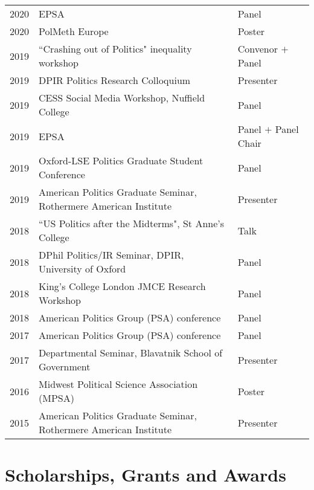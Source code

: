 \documentclass[11pt, a4paper]{article}
\begin{document}
 \begin{tabular}{lll}
 	 2020 & EPSA & Panel \\
     2020 & PolMeth Europe & Poster \\
     2019 & ``Crashing out of Politics" inequality workshop & Convenor $+$ Panel \\
     2019 & DPIR Politics Research Colloquium & Presenter \\
     2019 & CESS Social Media Workshop, Nuffield College & Panel \\
     2019 & EPSA  & Panel $+$ Panel Chair \\
     2019 & Oxford-LSE Politics Graduate Student Conference & Panel \\
     2019 & American Politics Graduate Seminar, Rothermere American Institute & Presenter \\
     2018 & ``US Politics after the Midterms", St Anne's College & Talk \\
     2018 & DPhil Politics/IR Seminar, DPIR, University of Oxford & Panel \\
     2018 & King's College London JMCE Research Workshop & Panel \\
     2018 & American Politics Group (PSA) conference & Panel \\
     2017 & American Politics Group (PSA) conference & Panel \\
     2017 & Departmental Seminar, Blavatnik School of Government & Presenter \\
     2016 & Midwest Political Science Association (MPSA) & Poster \\
     2015 & American Politics Graduate Seminar, Rothermere American Institute & Presenter
 \end{tabular}

 \section*{Scholarships, Grants and Awards}
\end{document}
